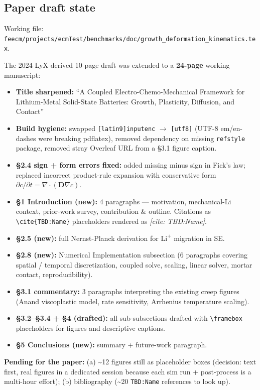 \documentclass[11pt,letterpaper]{article}
\newenvironment{tightitemize}{\begin{itemize}\setlength\itemsep{0pt}\setlength\parsep{0pt}}{\end{itemize}}
\newcommand{\code}[1]{\texttt{\small #1}}
\begin{document}
\subsection{Paper draft state}
Working file: \code{feecm/projects/ecmTest/benchmarks/doc/growth\_deformation\_kinematics.tex}.

The 2024 LyX-derived 10-page draft was extended to a \textbf{24-page} working manuscript:

\begin{tightitemize}
  \item \textbf{Title sharpened:} ``A Coupled Electro-Chemo-Mechanical Framework for Lithium-Metal Solid-State Batteries: Growth, Plasticity, Diffusion, and Contact''
  \item \textbf{Build hygiene:} swapped \code{[latin9]inputenc} $\to$ \code{[utf8]} (UTF-8 em/en-dashes were breaking pdflatex), removed dependency on missing \code{refstyle} package, removed stray Overleaf URL from a §3.1 figure caption.
  \item \textbf{§2.4 sign + form errors fixed:} added missing minus sign in Fick's law; replaced incorrect product-rule expansion with conservative form $\partial c/\partial t = \nabla\!\cdot\!(\mathbf{D}\nabla c)$.
  \item \textbf{§1 Introduction (new):} 4 paragraphs --- motivation, mechanical-Li context, prior-work survey, contribution \& outline. Citations as \code{\textbackslash{}cite\{TBD:Name\}} placeholders rendered as \emph{[cite: TBD:Name]}.
  \item \textbf{§2.5 (new):} full Nernst-Planck derivation for $\mathrm{Li}^+$ migration in SE.
  \item \textbf{§2.8 (new):} Numerical Implementation subsection (6 paragraphs covering spatial / temporal discretization, coupled solve, scaling, linear solver, mortar contact, reproducibility).
  \item \textbf{§3.1 commentary:} 3 paragraphs interpreting the existing creep figures (Anand viscoplastic model, rate sensitivity, Arrhenius temperature scaling).
  \item \textbf{§3.2--§3.4 + §4 (drafted):} all sub-subsections drafted with \code{\textbackslash{}framebox} placeholders for figures and descriptive captions.
  \item \textbf{§5 Conclusions (new):} summary + future-work paragraph.
\end{tightitemize}

\textbf{Pending for the paper:} (a) \textasciitilde{}12 figures still as placeholder boxes (decision: text first, real figures in a dedicated session because each sim run + post-process is a multi-hour effort); (b) bibliography (\textasciitilde{}20 \code{TBD:Name} references to look up).
\end{document}

